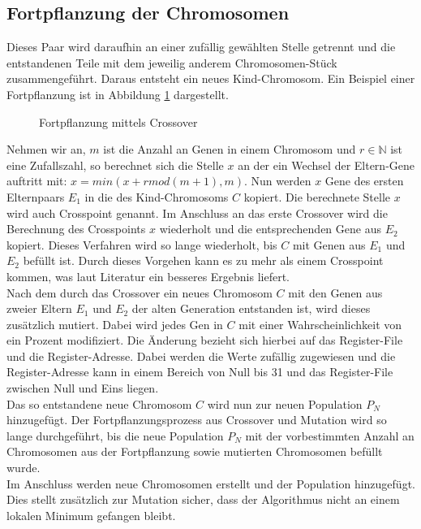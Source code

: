 \subsection{Fortpflanzung der Chromosomen}
Dieses Paar wird daraufhin an einer zufällig gewählten Stelle getrennt und die entstandenen Teile mit dem jeweilig anderem Chromosomen-Stück zusammengeführt. Daraus entsteht ein neues Kind-Chromosom. Ein Beispiel einer Fortpflanzung ist in Abbildung \ref{fig:crossover} dargestellt.
\begin{figure}[H] 
	\centering
	
	\caption{Fortpflanzung mittels Crossover}
	\label{fig:crossover}
\end{figure}
Nehmen wir an, $m$ ist die Anzahl an Genen in einem Chromosom und $r \in \mathbb{N}$ ist eine Zufallszahl, so berechnet sich die Stelle $x$ an der ein Wechsel der Eltern-Gene auftritt mit: $x= min(x+r mod(m+1),m)$. Nun werden $x$ Gene des ersten Elternpaars $E_1$ in die des Kind-Chromosoms $C$ kopiert. Die berechnete Stelle $x$ wird auch Crosspoint genannt. Im Anschluss an das erste Crossover wird die Berechnung des Crosspoints $x$ wiederholt und die entsprechenden Gene aus $E_2$ kopiert. Dieses Verfahren wird so lange wiederholt, bis $C$ mit Genen aus $E_1$ und $E_2$ befüllt ist. Durch dieses Vorgehen kann es zu mehr als einem Crosspoint kommen, was laut Literatur ein besseres Ergebnis liefert.\cite{reeves2003genetic} \\
Nach dem durch das Crossover ein neues Chromosom $C$ mit den Genen aus zweier Eltern $E_1$ und $E_2$ der alten Generation entstanden ist, wird dieses zusätzlich mutiert. Dabei wird jedes Gen in $C$ mit einer Wahrscheinlichkeit von ein Prozent modifiziert. Die Änderung bezieht sich hierbei auf das Register-File und die Register-Adresse. Dabei werden die Werte zufällig zugewiesen und die Register-Adresse kann in einem Bereich von Null bis 31 und das Register-File zwischen Null und Eins liegen.\\
Das so entstandene neue Chromosom $C$ wird nun zur neuen Population $P_N$ hinzugefügt. Der Fortpflanzungsprozess aus Crossover und Mutation wird so lange durchgeführt, bis die neue Population $P_N$ mit der vorbestimmten Anzahl an Chromosomen aus der Fortpflanzung sowie mutierten Chromosomen befüllt wurde.\\
Im Anschluss werden neue Chromosomen erstellt und der Population hinzugefügt. Dies stellt zusätzlich zur Mutation sicher, dass der Algorithmus nicht an einem lokalen Minimum gefangen bleibt. 

